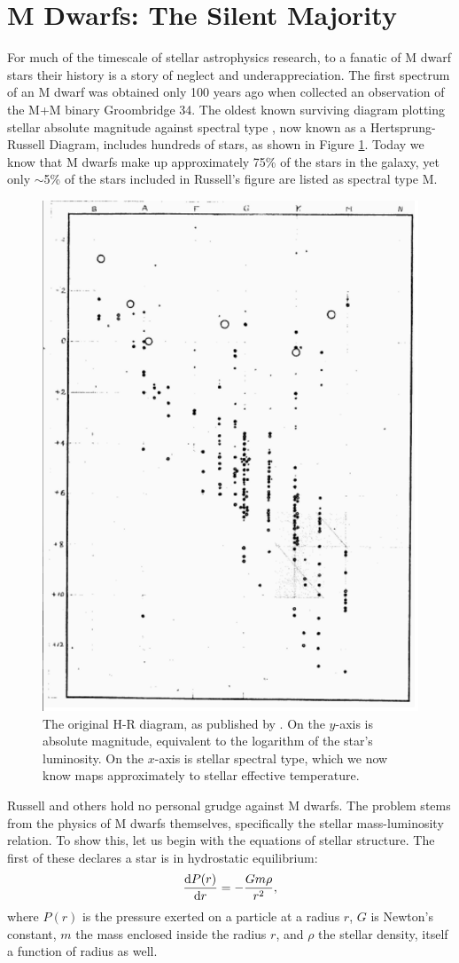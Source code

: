 \section{M Dwarfs: The Silent Majority}
For much of the timescale of stellar astrophysics research, to a fanatic 
of M dwarf stars their history is a story of neglect and underappreciation.
The first spectrum of an M dwarf was obtained only 100 years ago when 
\citet{Adams13} collected an observation of the M+M binary Groombridge 34.
The oldest known surviving diagram plotting stellar absolute magnitude against spectral type \citep{Russell14}, now known as a Hertsprung-Russell Diagram, includes hundreds of stars, as shown in Figure \ref{fig:HR}.
Today we know that M dwarfs make up approximately 75\% of the stars in the galaxy,
yet only $\sim$5\% of the stars included in Russell's figure are listed as
spectral type M.



\begin{figure}[hbt!]
\centering
\includegraphics[width=.5\textwidth]{chapter1/hr.png}
\caption[Russell's original H-R Diagram]{The original H-R diagram, as published by
\citet{Russell14}. On the $y$-axis is absolute magnitude, equivalent to the logarithm
of the star's luminosity. On the $x$-axis is stellar spectral type, which we now know
maps approximately to stellar effective temperature.}
\label{fig:HR}
\end{figure}

Russell and others hold no personal grudge against M dwarfs. The problem stems from the physics
of M dwarfs themselves, specifically the stellar mass-luminosity relation.
To show this, let us begin with the equations of stellar structure.
The first of these declares a star is in hydrostatic equilibrium:
\begin{equation}
\frac{\operatorname{d}\!{P}(r)}{\operatorname{d}\!{r}} = - \frac{ G m \rho}{r^2 },
\label{eq:hydro}
\end{equation}
where $P(r)$ is the pressure exerted on a particle at a radius $r$, $G$ is Newton's
constant, $m$ the mass enclosed inside the radius $r$, and $\rho$ the stellar density,
itself a function of radius as well.

